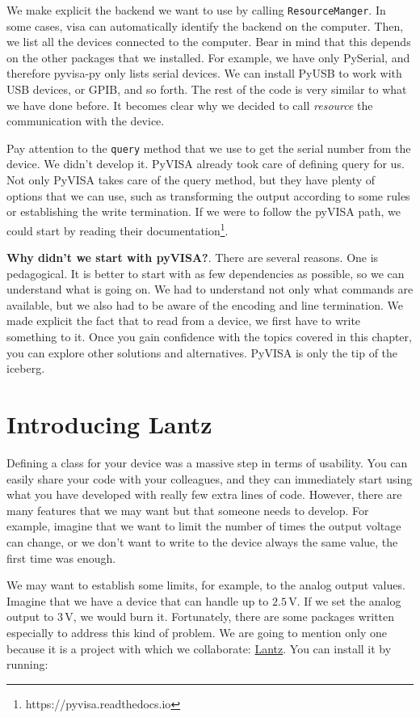 We make explicit the backend we want to use by calling \texttt{ResourceManger}. In some cases, visa can automatically identify the backend on the computer. Then, we list all the devices connected to the computer. Bear in mind that this depends on the other packages that we installed. For example, we have only PySerial, and therefore pyvisa-py only lists serial devices. We can install PyUSB to work with USB devices, or GPIB, and so forth. The rest of the code is very similar to what we have done before. It becomes clear why we decided to call \emph{resource} the communication with the device.

Pay attention to the \texttt{query} method that we use to get the serial number from the device. We didn't develop it. PyVISA already took care of defining query for us. Not only PyVISA takes care of the query method, but they have plenty of options that we can use, such as transforming the output according to some rules or establishing the write termination. If we were to follow the pyVISA path, we could start by reading their documentation\footnote{https://pyvisa.readthedocs.io}.

\textbf{Why didn't we start with pyVISA?}. There are several reasons. One is pedagogical. It is better to start with as few dependencies as possible, so we can understand what is going on. We had to understand not only what commands are available, but we also had to be aware of the encoding and line termination. We made explicit the fact that to read from a device, we first have to write something to it. Once you gain confidence with the topics covered in this chapter, you can explore other solutions and alternatives. PyVISA is only the tip of the iceberg.

\section{Introducing Lantz}\label{sec:lantz}
Defining a class for your device was a massive step in terms of usability. You can easily share your code with your colleagues, and they can immediately start using what you have developed with really few extra lines of code. However, there are many features that we may want but that someone needs to develop. For example, imagine that we want to limit the number of times the output voltage can change, or we don't want to write to the device always the same value, the first time was enough.

We may want to establish some limits, for example, to the analog output values. Imagine that we have a device that can handle up to $2.5\,\textrm{V}$. If we set the analog output to $3\,\textrm{V}$, we would burn it. Fortunately, there are some packages written especially to address this kind of problem. We are going to mention only one because it is a project with which we collaborate: \href{https://github.com/lantzproject/lantz}{Lantz}. You can install it by running:

